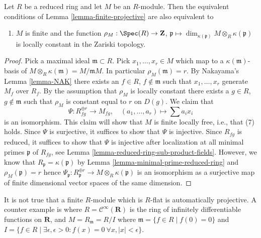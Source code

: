 \begin{lemma}
\label{lemma-finite-projective-reduced}
Let $R$ be a reduced ring and let $M$ be an $R$-module. Then the
equivalent conditions of Lemma \ref{lemma-finite-projective}
are also equivalent to
\begin{enumerate}
\item[(9)] $M$ is finite and the function
$\rho_M : \Spec(R) \to \mathbf{Z}$, $\mathfrak p \mapsto
\dim_{\kappa(\mathfrak p)} M \otimes_R \kappa(\mathfrak p)$
is locally constant in the Zariski topology.
\end{enumerate}
\end{lemma}

\begin{proof}
Pick a maximal ideal $\mathfrak m \subset R$.
Pick $x_1, \ldots, x_r \in M$ which map to a $\kappa(\mathfrak m)$-basis of
$M \otimes_R \kappa(\mathfrak m) = M/\mathfrak mM$. In particular
$\rho_M(\mathfrak m) = r$. By
Nakayama's Lemma \ref{lemma-NAK}
there exists an $f \in R$, $f \not \in \mathfrak m$ such that
$x_1, \ldots, x_r$ generate $M_f$ over $R_f$. By the assumption that
$\rho_M$ is locally constant there exists a $g \in R$, $g \not \in \mathfrak m$
such that $\rho_M$ is constant equal to $r$ on $D(g)$. We claim that
$$
\Psi : R_{fg}^{\oplus r} \longrightarrow M_{fg}, \quad
(a_1, \ldots, a_r) \longmapsto \sum a_i x_i
$$
is an isomorphism. This claim will show that $M$ is finite locally
free, i.e., that (7) holds. Since $\Psi$ is surjective, it suffices to
show that $\Psi$ is injective. Since $R_{fg}$ is reduced,
it suffices to show that $\Psi$ is injective after localization
at all minimal primes $\mathfrak p$ of $R_{fg}$, see
Lemma \ref{lemma-reduced-ring-sub-product-fields}.
However, we know that $R_\mathfrak p = \kappa(\mathfrak p)$
by Lemma \ref{lemma-minimal-prime-reduced-ring} and
$\rho_M(\mathfrak p) = r$ hence $\Psi_\mathfrak p :
R_\mathfrak p^{\oplus r} \to M \otimes_R \kappa(\mathfrak p)$
is an isomorphism as a surjective map of finite dimensional
vector spaces of the same dimension.
\end{proof}

\begin{remark}
\label{remark-warning}
It is not true that a finite $R$-module which is
$R$-flat is automatically projective. A counter
example is where $R = \mathcal{C}^\infty(\mathbf{R})$
is the ring of infinitely differentiable functions on
$\mathbf{R}$, and $M = R_{\mathfrak m} = R/I$ where
$\mathfrak m = \{f \in R \mid f(0) = 0\}$ and
$I = \{f \in R \mid \exists \epsilon, \epsilon > 0 :
f(x) = 0\ \forall x, |x| < \epsilon\}$.
\end{remark}

